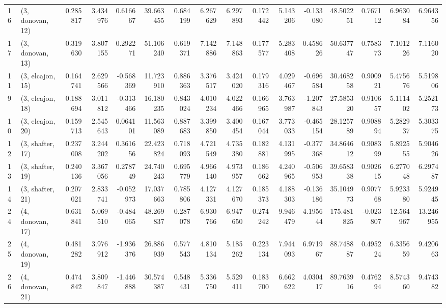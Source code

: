 \begin{tabular}{llrrrrrrrrrrrrrr}
16 &  (3, donovan, 12) &   0.285817 &  3.434976 &  0.616667 &  39.663455 &  0.684199 &   6.267629 &  6.297893 &  0.172442 &  5.143206 & -0.133080 &   48.502251 &  0.767112 &   6.963084 &   6.964356 \\
17 &  (3, donovan, 13) &   0.319630 &  3.807155 &  0.292271 &  51.106240 &  0.619371 &   7.142886 &  7.148863 &  0.177577 &  5.283408 &  0.458626 &   50.637747 &  0.758373 &   7.101226 &   7.116020 \\
11 &  (3, elcajon, 15) &   0.164741 &  2.629566 & -0.568369 &  11.723910 &  0.886363 &   3.376517 &  3.424020 &  0.179316 &  4.029467 & -0.696584 &   30.468258 &  0.900921 &   5.475676 &   5.519806 \\
9  &  (3, elcajon, 18) &   0.188694 &  3.011812 & -0.313466 &  16.180235 &  0.843024 &   4.010234 &  4.022466 &  0.166965 &  3.763987 & -1.207843 &   27.585320 &  0.910657 &   5.111402 &   5.252173 \\
10 &  (3, elcajon, 20) &   0.159713 &  2.545643 &  0.064101 &  11.563089 &  0.887683 &   3.399850 &  3.400454 &  0.167044 &  3.773033 & -0.465154 &   28.125789 &  0.908894 &   5.282937 &   5.303375 \\
12 &  (3, shafter, 17) &   0.237008 &  3.244202 &  0.361656 &  22.423824 &  0.718093 &   4.721549 &  4.735380 &  0.182881 &  4.131995 & -0.377368 &   34.864612 &  0.908399 &   5.892555 &   5.904626 \\
13 &  (3, shafter, 19) &   0.240136 &  3.367056 &  0.278749 &  24.740243 &  0.695779 &   4.966140 &  4.973957 &  0.186662 &  4.240965 & -0.506953 &   39.658338 &  0.902615 &   6.277048 &   6.297487 \\
14 &  (3, shafter, 21) &   0.207021 &  2.833741 & -0.052973 &  17.037663 &  0.785806 &   4.127331 &  4.127670 &  0.185373 &  4.188303 & -0.136186 &   35.104973 &  0.907768 &   5.923380 &   5.924945 \\
24 &  (4, donovan, 17) &   0.631841 &  5.069510 & -0.484065 &  48.269837 &  0.287078 &   6.930766 &  6.947650 &  0.274242 &  9.946479 &  4.195644 &  175.481825 & -0.023807 &  12.564967 &  13.246955 \\
25 &  (4, donovan, 19) &   0.481282 &  3.976912 & -1.936376 &  26.886939 &  0.577543 &   4.810134 &  5.185262 &  0.223134 &  7.944093 &  6.971967 &   88.748887 &  0.495224 &   6.335659 &   9.420663 \\
26 &  (4, donovan, 21) &   0.474842 &  3.809847 & -1.446888 &  30.574387 &  0.548431 &   5.336750 &  5.529411 &  0.183700 &  6.662622 &  4.030417 &   89.763916 &  0.476294 &   8.574360 &   9.474382 \\

\end{tabular}
